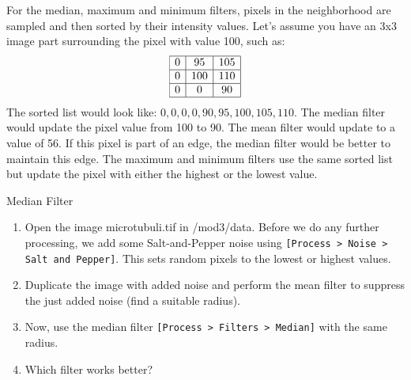 For the median, maximum and minimum filters, pixels in the neighborhood are sampled and then sorted by their intensity values. Let's assume you have an 3x3 image part surrounding the pixel with value 100, such as:
	\[
		\begin{array}{|c|c|c|}
	\hline
	0&95&105\\
\hline
0&100&110\\
\hline
0&0&90\\
\hline
	\end{array}
\]
 The sorted list would look like: $0,0,0,0,90,95,100,105,110$. The median filter would update the pixel value from 100 to 90. The mean filter would update to a value of 56. If this pixel is part of an edge, the median filter would be better to maintain this edge. The maximum and minimum filters use the same sorted list but update the pixel with either the highest or the lowest value.

\newpage
\begin{taskbox}{Median Filter}
\begin{enumerate}
	\item Open the image microtubuli.tif in /mod3/data. Before we do any further processing, we add some Salt-and-Pepper noise using \texttt{[Process > Noise > Salt and Pepper]}. This sets random pixels to the lowest or highest values.
	\item Duplicate the image with added noise and perform the mean filter to suppress the just added noise (find a suitable radius).
	\item Now, use the median filter \texttt{[Process > Filters > Median]} with the same radius.
	\item Which filter works better?
	\end{enumerate}
\end{taskbox}

